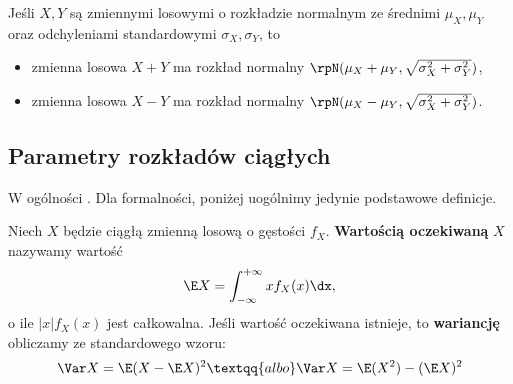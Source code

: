 \begin{center}
\end{center}

Jeśli $X, Y$ są  zmiennymi losowymi o rozkładzie normalnym ze średnimi $\mu_X, \mu_Y$ oraz odchyleniami standardowymi $\sigma_X, \sigma_Y$, to
\begin{itemize}
    \item zmienna losowa $X + Y$ ma rozkład normalny $\rpN(\mu_X + \mu_Y, \sqrt{\sigma_X^2 + \sigma_Y^2})$,
    \item zmienna losowa $X - Y$ ma rozkład normalny $\rpN(\mu_X - \mu_Y, \sqrt{\sigma_X^2 + \sigma_Y^2})$.
\end{itemize}

\subsection{Parametry rozkładów ciągłych}

W ogólności . Dla formalności, poniżej uogólnimy jedynie podstawowe definicje.
\bigskip

Niech $X$ będzie ciągłą zmienną losową o gęstości $f_X$. \textbf{Wartością oczekiwaną} $X$ nazywamy wartość
$$\E X = \int_{-\infty}^{+\infty} x f_X(x) \dx,$$
o ile $|x|f_X(x)$ jest całkowalna. Jeśli wartość oczekiwana istnieje, to \textbf{wariancję} obliczamy ze standardowego wzoru:
$$\Var X = \E(X - \E X)^2 \textqq{albo} \Var X = \E(X^2) - (\E X)^2$$

